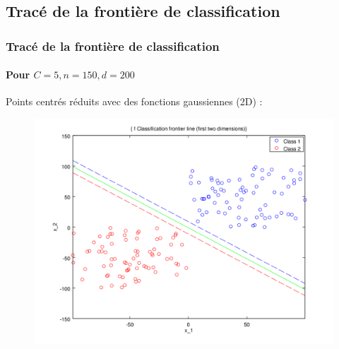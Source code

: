 \documentclass{beamer}
\begin{document}
\subsection{Tracé de la frontière de classification}

\begin{frame}
\tableofcontents[currentsubsection]
\end{frame}

\begin{frame}
\frametitle{Tracé de la frontière de classification}
\framesubtitle{Pour $C = 5, n = 150, d = 200$}

Points centrés réduits avec des fonctions gaussiennes (2D) :

         \begin{figure}
         \centering
         \includegraphics[scale=0.4]{images/line4.png}
         \end{figure}

\end{frame}
\end{document}
